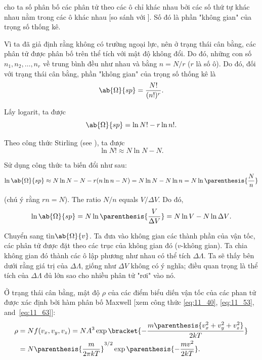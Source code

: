 \noindent
cho ta số phân bố các phân tử theo các ô chỉ khác nhau bởi các số thứ tự khác nhau nằm trong các ô khác nhau [so sánh với ]. Số đó là phần "không gian" của trọng số thống kê.

Vì ta đã giả định rằng không có trường ngoại lực, nên ở trạng thái cân bằng, các phân tử được phân bố trên thể tích với mật độ không đổi. Do đó, những con số $n_1, n_2, \ldots, n_r$ về trung bình đều như nhau và bằng $n=N/r$ ($r$ là số ô). Do đó, đối với trạng thái cân bằng, phần "không gian" của trọng số thống kê là
\begin{equation*}
	\ab{\Omega}{sp} = \frac{N!}{(n!)^r}.
\end{equation*}

\noindent
Lấy logarit, ta được
\begin{equation}\label{eq:11_99}
	\ab{\Omega}{sp} = \ln{N!} - r\ln{n!}.
\end{equation}

\noindent
Theo công thức Stirling (see ), ta được
\begin{equation}\label{eq:11_100}
	\ln{N!} \approx N\ln{N} - N.
\end{equation}

\noindent
Sử dụng công thức  ta biến đổi như sau:
\begin{equation*}
	\ln{\ab{\Omega}{sp}} \approx N\ln{N} - N - r(n\ln{n} - N) = N\ln{N} - N\ln{n} = N\ln\parenthesis{\frac{N}{n}}
\end{equation*}

\noindent
(chú ý rằng $rn=N$). The ratio $N/n$ equals $V/\Delta V$. Do đó,
\begin{equation}\label{eq:11_101}
	\ln{\ab{\Omega}{sp}} = N\ln\parenthesis{\frac{V}{\Delta V}} = N\ln{V} - N\ln{\Delta V}.
\end{equation}

Chuyển sang tìn$\ab{\Omega}{v}$. Ta đưa vào không gian các thành phần của vận tốc, các phân tử được đặt theo các trục của không gian đó ($v$-không gian). Ta chia không gian đó thành các ô lập phương như nhau có thể tích $\Delta\Lambda$. Ta sẽ thấy bên dưới rằng giá trị của $\Delta\Lambda$, giống như $\Delta V$ không có ý nghĩa; điều quan trọng là thể tích của $\Delta\Lambda$ đủ lớn sao cho nhiều phân tử "rơi" vào nó.

Ở trạng thái cân bằng, mật độ $\rho$ của các điểm biểu diến vận tốc của các phan tử được xác định bởi hàm phân bố Maxwell [xem công thức \eqref{eq:11_40}, \eqref{eq:11_53}, and~\eqref{eq:11_63}]:
\begin{align*}
	\rho &= N f(v_x, v_y, v_z) = NA^3 \exp\bracket{-\frac{m\parenthesis{v_x^2+v_y^2+v_z^2}}{2kT}}\\
	& = N \parenthesis{\frac{m}{2\pi kT}}^{3/2} \exp\parenthesis{-\frac{mv^2}{2kT}}.
\end{align*}

